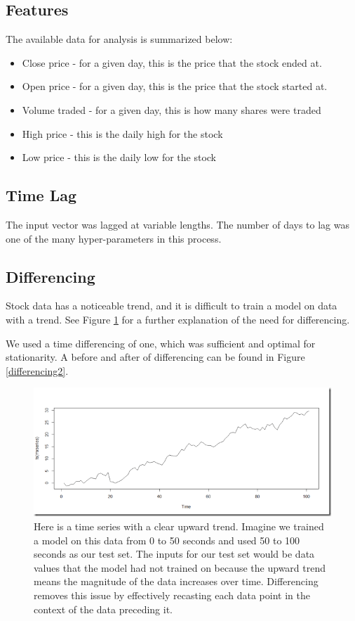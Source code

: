 \documentclass[12pt]{article}
\begin{document}
\subsection{Features}
The available data for analysis is summarized below:

\begin{itemize}
	\item Close price - for a given day, this is the price that the stock ended at.
	\item Open price - for a given day, this is the price that the stock started at.
	\item Volume traded - for a given day, this is how many shares were traded
	\item High price - this is the daily high for the stock
	\item Low price - this is the daily low for the stock
\end{itemize}

\subsection{Time Lag}
The input vector was lagged at variable lengths. The number of days to lag was one of the many hyper-parameters in this process. 

\subsection{Differencing}
Stock data has a noticeable trend, and it is difficult to train a model on data with a trend. See Figure \ref{differencing} for a further explanation of the need for differencing.

We used a time differencing of one, which was sufficient and optimal for stationarity. A before and after of differencing can be found in Figure \ref{differencing2}. 

\begin{figure}
	\centering
	\includegraphics[width=.75\linewidth]{difference.png}
	\caption{Here is a time series with a clear upward trend. Imagine we trained a model on this data from 0 to 50 seconds and used 50 to 100 seconds as our test set. The inputs for our test set would be data values that the model had not trained on because the upward trend means the magnitude of the data increases over time. Differencing removes this issue by effectively recasting each data point in the context of the data preceding it.}
	\label{differencing}
\end{figure}
\end{document}
